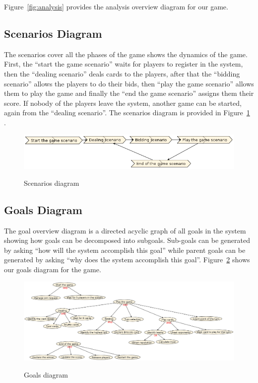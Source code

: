 \documentclass[a4paper]{article}
\begin{document}
Figure~\ref{fig:analysis} provides the analysis overview diagram for our game.


\subsection{Scenarios Diagram}

The scenarios cover all the phases of the game shows the dynamics of the game. First, the ``start the game scenario'' waits for players to register in the system, then the ``dealing scenario'' deals cards to the players, after that the ``bidding scenario'' allows the players to do their bids, then ``play the game scenario'' allows them to play the game and finally the ``end the game scenario'' assigns them their score. If nobody of the players leave the system, another game can be started, again from the ``dealing scenario''. The scenarios diagram is provided in Figure~\ref{fig:scenarios} .

\begin{figure}[htp]
  \centering
  \includegraphics[keepaspectratio,scale=0.5]{pdt/images/system_specification/scenarios.png}
  \label{fig:scenarios}
  \caption{Scenarios diagram}
\end{figure}

\subsection{Goals Diagram}

The goal overview diagram is a directed acyclic graph of all goals in the system showing how goals can be decomposed into subgoals. Sub-goals can be generated by asking ``how will the system accomplish this goal'' while parent goals can be generated by asking ``why does the system accomplish this goal''. Figure~\ref{fig:goals} shows our goals diagram for the game.

\begin{figure}[htp]
  \centering
  \includegraphics[keepaspectratio,scale=0.4]{pdt/images/system_specification/goal_overview.png}
  \label{fig:goals}
  \caption{Goals diagram}
\end{figure}
  
\end{document}
